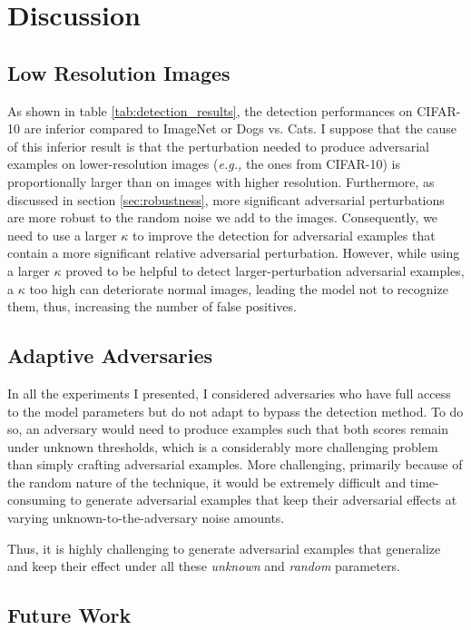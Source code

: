 \chapter{Discussion}
\label{discussion}

\section{Low Resolution Images}

As shown in table \ref{tab:detection_results}, the detection performances on
CIFAR-10 are inferior compared to ImageNet or Dogs vs. Cats. I suppose that the
cause of this inferior result is that the perturbation needed to produce
adversarial examples on lower-resolution images (\emph{e.g.,} the ones from
CIFAR-10) is proportionally larger than on images with higher resolution.
Furthermore, as discussed in section \ref{sec:robustness}, more significant
adversarial perturbations are more robust to the random noise we add to the
images. Consequently, we need to use a larger $\kappa$ to improve the detection
for adversarial examples that contain a more significant relative adversarial
perturbation. However, while using a larger $\kappa$ proved to be helpful to
detect larger-perturbation adversarial examples, a $\kappa$ too high can
deteriorate normal images, leading the model not to recognize them, thus,
increasing the number of false positives.

\section{Adaptive Adversaries}

In all the experiments I presented, I considered adversaries who have full
access to the model parameters but do not adapt to bypass the detection method.
To do so, an adversary would need to produce examples such that both scores
remain under unknown thresholds, which is a considerably more challenging
problem than simply crafting adversarial examples. More challenging, primarily
because of the random nature of the technique, it would be extremely difficult
and time-consuming to generate adversarial examples that keep their adversarial
effects at varying unknown-to-the-adversary noise amounts.

Thus, it is highly challenging to generate adversarial examples that generalize
and keep their effect under all these \emph{unknown} and \emph{random}
parameters.

\section{Future Work}

